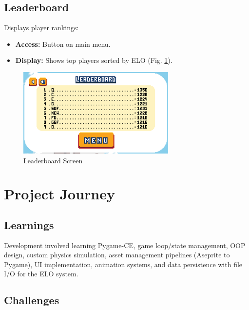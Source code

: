 \documentclass[11pt, a4paper]{article}
\begin{document}
\subsection{Leaderboard}

Displays player rankings:

\begin{itemize}

    \item \textbf{Access:} Button on main menu.
    
    \item \textbf{Display:} Shows top players sorted by ELO (Fig. \ref{fig:leaderboard_a}).

\end{itemize}

\begin{figure}[h!]

    \centering
    
    \includegraphics[width=0.7\textwidth]{images/leaderboard.png}
    
    \caption{Leaderboard Screen}
    
    \label{fig:leaderboard_a}

\end{figure}

\section{Project Journey}

\subsection{Learnings}

Development involved learning Pygame-CE, game loop/state management, OOP design, custom physics simulation, asset management pipelines (Aseprite to Pygame), UI implementation, animation systems, and data persistence with file I/O for the ELO system.

\subsection{Challenges}
\end{document}

